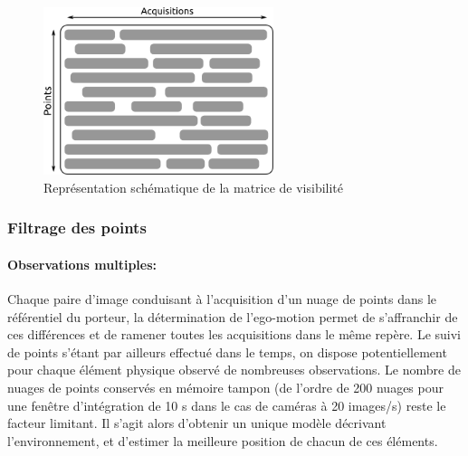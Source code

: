 \begin{figure}
	\centering
	\includegraphics[width=0.6\textwidth]{Chapter4/graphics/visibility_matrix.png}
	\caption{Représentation schématique de la matrice de visibilité}
	\label{fig:ch4_visibility_matrix}
\end{figure}

\subsubsection{Filtrage des points} \label{sec:ch4_filtrage_des_points}
\paragraph{Observations multiples:\\}
Chaque paire d'image conduisant à l'acquisition d'un nuage de points dans le référentiel du porteur, la détermination de l'ego-motion permet de s'affranchir de ces différences et de ramener toutes les acquisitions dans le même repère. Le suivi de points s'étant par ailleurs effectué dans le temps, on dispose potentiellement pour chaque élément physique observé de nombreuses observations. Le nombre de nuages de points conservés en mémoire tampon (de l'ordre de 200 nuages pour une fenêtre d'intégration de 10 s dans le cas de caméras à 20 images/s) reste le facteur limitant. Il s'agit alors d'obtenir un unique modèle décrivant l'environnement, et d'estimer la meilleure position de chacun de ces éléments.\\


